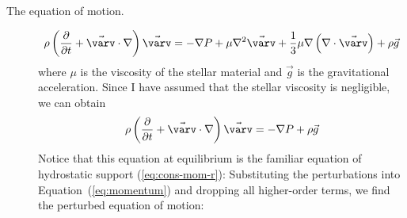 \begin{description}
    \item[The equation of motion.] 
    \begin{equation} 
        \rho
        \left(
            \frac{\partial}{\partial t}
            +
            \vec{\varv}
            \cdot
            \nabla 
        \right)
        \vec{\varv}
        =
        -\nabla P
        +
        \mu \nabla^2 \vec{\varv}
        +
        \frac{1}{3} \mu \nabla\left(
            \nabla \cdot \vec{\varv}
        \right)
        +
        \rho \vec{g}
    \end{equation}
    where $\mu$ is the viscosity of the stellar material and $\vec{g}$ is the gravitational acceleration.
    Since I have assumed that the stellar viscosity is negligible, we can obtain 
    \begin{equation} \label{eq:momentum} %
        \rho
        \left(
            \frac{\partial}{\partial t}
            +
            \vec{\varv}
            \cdot
            \nabla 
        \right)
        \vec{\varv}
        =
        -
        \nabla P
        +
        \rho \vec g%
    \end{equation}
    Notice that this equation at equilibrium is the familiar equation of hydrostatic support (\ref{eq:cons-mom-r}):
    Substituting the perturbations into Equation~(\ref{eq:momentum}) and dropping all higher-order terms, we find the perturbed equation of motion:
    

\end{description}
